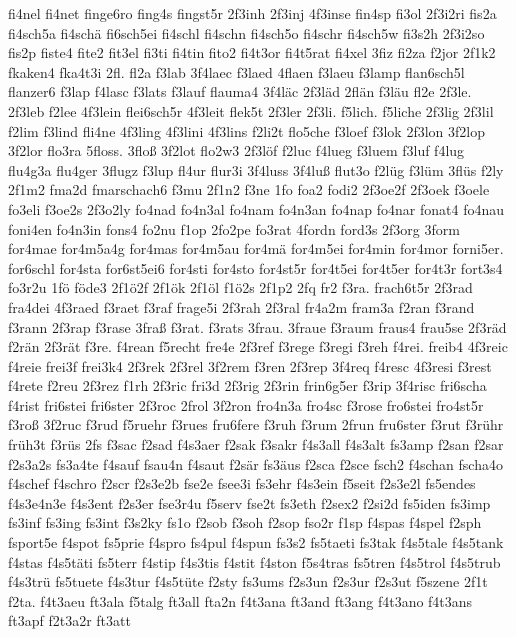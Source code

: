 {fi4nel
fi4net
finge6ro
fing4s
fingst5r
2f3inh
2f3inj
4f3inse
fin4sp
fi3ol
2f3i2ri
fis2a
fi4sch5a
fi4schä
fi6sch5ei
fi4schl
fi4schn
fi4sch5o
fi4schr
fi4sch5w
fi3s2h
2f3i2so
fis2p
fiste4
fite2
fit3el
fi3ti
fi4tin
fito2
fi4t3or
fi4t5rat
fi4xel
3fiz
fi2za
f2jor
2f1k2
fkaken4
fka4t3i
2fl.
fl2a
f3lab
3f4laec
f3laed
4flaen
f3laeu
f3lamp
flan6sch5l
flanzer6
f3lap
f4lasc
f3lats
f3lauf
flauma4
3f4läc
2f3läd
2flän
f3läu
fl2e
2f3le.
2f3leb
f2lee
4f3lein
flei6sch5r
4f3leit
flek5t
2f3ler
2f3li.
f5lich.
f5liche
2f3lig
2f3lil
f2lim
f3lind
fli4ne
4f3ling
4f3lini
4f3lins
f2li2t
flo5che
f3loef
f3lok
2f3lon
3f2lop
3f2lor
flo3ra
5floss.
3floß
3f2lot
flo2w3
2f3löf
f2luc
f4lueg
f3luem
f3luf
f4lug
flu4g3a
flu4ger
3flugz
f3lup
fl4ur
flur3i
3f4luss
3f4luß
flut3o
f2lüg
f3lüm
3flüs
f2ly
2f1m2
fma2d
fmarschach6
f3mu
2f1n2
f3ne
1fo
foa2
fodi2
2f3oe2f
2f3oek
f3oele
fo3eli
f3oe2s
2f3o2ly
fo4nad
fo4n3al
fo4nam
fo4n3an
fo4nap
fo4nar
fonat4
fo4nau
foni4en
fo4n3in
fons4
fo2nu
f1op
2fo2pe
fo3rat
4fordn
ford3s
2f3org
3form
for4mae
for4m5a4g
for4mas
for4m5au
for4mä
for4m5ei
for4min
for4mor
forni5er.
for6schl
for4sta
for6st5ei6
for4sti
for4sto
for4st5r
for4t5ei
for4t5er
for4t3r
fort3s4
fo3r2u
1fö
föde3
2f1ö2f
2f1ök
2f1öl
f1ö2s
2f1p2
2fq
fr2
f3ra.
frach6t5r
2f3rad
fra4dei
4f3raed
f3raet
f3raf
frage5i
2f3rah
2f3ral
fr4a2m
fram3a
f2ran
f3rand
f3rann
2f3rap
f3rase
3fraß
f3rat.
f3rats
3frau.
3fraue
f3raum
fraus4
frau5se
2f3räd
f2rän
2f3rät
f3re.
f4rean
f5recht
fre4e
2f3ref
f3rege
f3regi
f3reh
f4rei.
freib4
4f3reic
f4reie
frei3f
frei3k4
2f3rek
2f3rel
3f2rem
f3ren
2f3rep
3f4req
f4resc
4f3resi
f3rest
f4rete
f2reu
2f3rez
f1rh
2f3ric
fri3d
2f3rig
2f3rin
frin6g5er
f3rip
3f4risc
fri6scha
f4rist
fri6stei
fri6ster
2f3roc
2frol
3f2ron
fro4n3a
fro4sc
f3rose
fro6stei
fro4st5r
f3roß
3f2ruc
f3rud
f5ruehr
f3rues
fru6fere
f3ruh
f3rum
2frun
fru6ster
f3rut
f3rühr
früh3t
f3rüs
2fs
f3sac
f2sad
f4s3aer
f2sak
f3sakr
f4s3all
f4s3alt
fs3amp
f2san
f2sar
f2s3a2s
fs3a4te
f4sauf
fsau4n
f4saut
f2sär
fs3äus
f2sca
f2sce
fsch2
f4schan
fscha4o
f4schef
f4schro
f2scr
f2s3e2b
fse2e
fsee3i
fs3ehr
f4s3ein
f5seit
f2s3e2l
fs5endes
f4s3e4n3e
f4s3ent
f2s3er
fse3r4u
f5serv
fse2t
fs3eth
f2sex2
f2si2d
fs5iden
fs3imp
fs3inf
fs3ing
fs3int
f3s2ky
fs1o
f2sob
f3soh
f2sop
fso2r
f1sp
f4spas
f4spel
f2sph
fsport5e
f4spot
fs5prie
f4spro
fs4pul
f4spun
fs3s2
fs5taeti
fs3tak
f4s5tale
f4s5tank
f4stas
f4s5täti
fs5terr
f4stip
f4s3tis
f4stit
f4ston
f5s4tras
fs5tren
f4s5trol
f4s5trub
f4s3trü
fs5tuete
f4s3tur
f4s5tüte
f2sty
fs3ums
f2s3un
f2s3ur
f2s3ut
f5szene
2f1t
f2ta.
f4t3aeu
ft3ala
f5talg
ft3all
fta2n
f4t3ana
ft3and
ft3ang
f4t3ano
f4t3ans
ft3apf
f2t3a2r
ft3att
}
